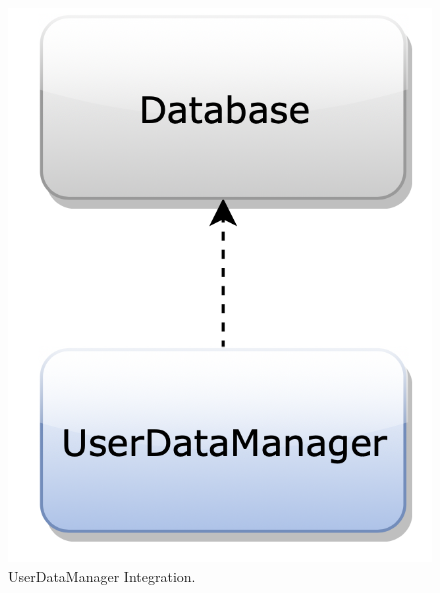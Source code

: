 \begin{figure}[H]
\begin{center}
        \begin{minipage}[c]{.40\textwidth}
	\centering
\includegraphics[scale=0.35]{Images/IntegrationPlanImages/fig5.png}
\caption{UserDataManager Integration.}
        \end{minipage}%
        \hspace{10mm}%
        \begin{minipage}[c]{.40\textwidth}
	\centering

\end{minipage}
\end{center}
\end{figure}

